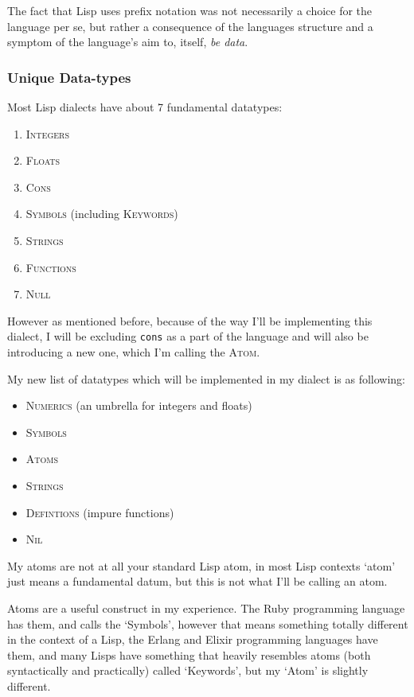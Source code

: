 \documentclass{article}
\newcommand{\code}[1]{\texttt{#1}}
\begin{document}
    The fact that Lisp uses prefix notation was not necessarily a choice for
    the language per se, but rather a consequence of the languages structure and
    a symptom of the language's aim to, itself, \emph{be data}.

    \subsubsection{Unique Data-types}
      Most Lisp dialects have about 7 fundamental datatypes:
      \begin{enumerate}
        \item \textsc{Integers}
        \item \textsc{Floats}
        \item \textsc{Cons}
        \item \textsc{Symbols} (including \textsc{Keywords})
        \item \textsc{Strings}
        \item \textsc{Functions}
        \item \textsc{Null}
      \end{enumerate}

      However as mentioned before, because of the way I'll be implementing this
      dialect, I will be excluding \code{cons} as a part of the language and will
      also be introducing a new one, which I'm calling the \textsc{Atom}.

      My new list of datatypes which will be implemented in my dialect is as
      following:

      \begin{itemize}
        \item \textsc{Numerics} (an umbrella for integers and floats)
        \item \textsc{Symbols}
        \item \textsc{Atoms}
        \item \textsc{Strings}
        \item \textsc{Defintions} (impure functions)
        \item \textsc{Nil}
      \end{itemize}

      My atoms are not at all your standard Lisp atom, in most Lisp contexts
      `atom' just means a fundamental datum, but this is not what I'll be
      calling an atom.

      Atoms are a useful construct in my experience. The Ruby programming language
      has them, and calls the `Symbols', however that means something totally
      different in the context of a Lisp, the Erlang and Elixir programming
      languages have them, and many Lisps have something that heavily resembles
      atoms (both syntactically and practically) called `Keywords', but my `Atom'
      is slightly different.
\end{document}

